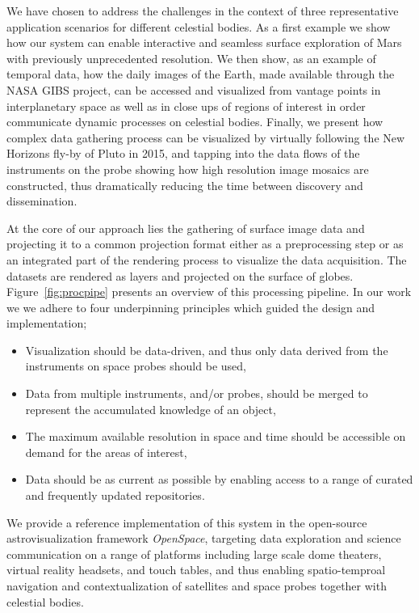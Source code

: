 \documentclass[journal]{vgtc}                %
\newcommand{\fig}[1]{Figure~\ref{fig:#1}}
\begin{document}
We have chosen to address the challenges in the context of three representative application scenarios for different celestial bodies.
As a first example we show how our system can enable interactive and seamless surface exploration of Mars with previously unprecedented resolution.
We then show, as an example of temporal data, how the daily images of the Earth, made  available through the NASA GIBS project, can be accessed and visualized from vantage points in interplanetary space as well as in close ups of regions of interest in order communicate dynamic processes on celestial bodies.
Finally, we present how complex data gathering process can be visualized by virtually following the New Horizons fly-by of Pluto in 2015, and tapping into the data flows of the instruments on the probe showing how high resolution image mosaics are constructed, thus dramatically reducing the time between discovery and dissemination.

At the core of our approach lies the gathering of surface image data and projecting it to a common projection format either as a preprocessing step or as an integrated part of the rendering process to visualize the data acquisition.
The datasets are rendered as layers and projected on the surface of globes.
\fig{procpipe} presents an overview of this processing pipeline.
In our work we we adhere to four underpinning principles which guided the design and implementation;

\begin{itemize} 
  \item Visualization should be data-driven, and thus only data derived from the instruments on space probes should be used,
  \item Data from multiple instruments, and/or probes, should be merged to represent the accumulated knowledge of an object,
  \item The maximum available resolution in space and time should be accessible on demand for the areas of interest,
  \item Data should be as current as possible by enabling access to a range of curated and frequently updated repositories.
\end{itemize}

We provide a reference implementation of this system in the open-source astrovisualization framework \emph{OpenSpace}, targeting data exploration and science communication on a range of platforms including large scale dome theaters, virtual reality headsets, and touch tables, and thus enabling spatio-temproal navigation and contextualization of satellites and space probes together with celestial bodies.
\end{document}
